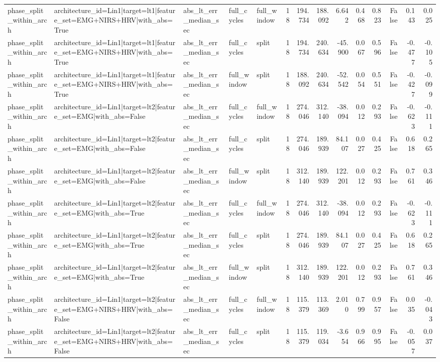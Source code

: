 \begin{table}
\begin{tabular}{lllllrrrrrrrrr}
phase_split_within_arch & architecture_id=Lin1|target=lt1|feature_set=EMG+NIRS+HRV|with_abs=True & abs_lt_err_median_sec & full_cycles & full_window & 18 & 194.734 & 188.092 & 6.642 & 0.468 & 0.823 & False & 0.143 & 0.025 \\
phase_split_within_arch & architecture_id=Lin1|target=lt1|feature_set=EMG+NIRS+HRV|with_abs=True & abs_lt_err_median_sec & full_cycles & split & 18 & 194.734 & 240.634 & -45.900 & 0.067 & 0.596 & False & -0.477 & -0.105 \\
phase_split_within_arch & architecture_id=Lin1|target=lt1|feature_set=EMG+NIRS+HRV|with_abs=True & abs_lt_err_median_sec & full_window & split & 18 & 188.092 & 240.634 & -52.542 & 0.054 & 0.551 & False & -0.427 & -0.099 \\
phase_split_within_arch & architecture_id=Lin1|target=lt2|feature_set=EMG|with_abs=False & abs_lt_err_median_sec & full_cycles & full_window & 18 & 274.046 & 312.140 & -38.094 & 0.012 & 0.293 & False & -0.623 & -0.111 \\
phase_split_within_arch & architecture_id=Lin1|target=lt2|feature_set=EMG|with_abs=False & abs_lt_err_median_sec & full_cycles & split & 18 & 274.046 & 189.939 & 84.107 & 0.027 & 0.425 & False & 0.618 & 0.265 \\
phase_split_within_arch & architecture_id=Lin1|target=lt2|feature_set=EMG|with_abs=False & abs_lt_err_median_sec & full_window & split & 18 & 312.140 & 189.939 & 122.201 & 0.012 & 0.293 & False & 0.761 & 0.346 \\
phase_split_within_arch & architecture_id=Lin1|target=lt2|feature_set=EMG|with_abs=True & abs_lt_err_median_sec & full_cycles & full_window & 18 & 274.046 & 312.140 & -38.094 & 0.012 & 0.293 & False & -0.623 & -0.111 \\
phase_split_within_arch & architecture_id=Lin1|target=lt2|feature_set=EMG|with_abs=True & abs_lt_err_median_sec & full_cycles & split & 18 & 274.046 & 189.939 & 84.107 & 0.027 & 0.425 & False & 0.618 & 0.265 \\
phase_split_within_arch & architecture_id=Lin1|target=lt2|feature_set=EMG|with_abs=True & abs_lt_err_median_sec & full_window & split & 18 & 312.140 & 189.939 & 122.201 & 0.012 & 0.293 & False & 0.761 & 0.346 \\
phase_split_within_arch & architecture_id=Lin1|target=lt2|feature_set=EMG+NIRS+HRV|with_abs=False & abs_lt_err_median_sec & full_cycles & full_window & 18 & 115.379 & 113.369 & 2.010 & 0.799 & 0.957 & False & 0.035 & -0.043 \\
phase_split_within_arch & architecture_id=Lin1|target=lt2|feature_set=EMG+NIRS+HRV|with_abs=False & abs_lt_err_median_sec & full_cycles & split & 18 & 115.379 & 119.034 & -3.654 & 0.966 & 0.995 & False & -0.057 & 0.037 \\

\end{tabular}
\end{table}
